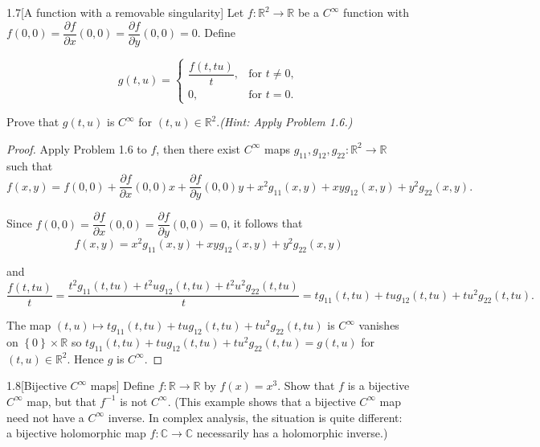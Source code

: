 \begin{problem}{1.7}[A function with a removable singularity]
Let \( f : \mathbb{R}^{2} \to \mathbb{R} \) be a \( C^{\infty} \) function with \( f(0,0) = \dfrac{\partial f}{\partial x} (0,0) = \dfrac{\partial f}{\partial y} (0,0) = 0 \). Define

\[
	g(t,u) =
	\begin{cases}
		\dfrac{f(t, tu)}{t}, & \text{for } t \neq 0, \\
		0,                   & \text{for } t = 0.
	\end{cases}
\]

Prove that \( g(t,u) \) is \( C^{\infty} \) for \( (t,u) \in \mathbb{R}^{2} \).\@\textit{(Hint: Apply Problem 1.6.)}
\end{problem}

\begin{proof}
	Apply Problem 1.6 to \( f \), then there exist \( C^{\infty} \) maps \( g_{11}, g_{12}, g_{22}: \mathbb{R}^{2} \to \mathbb{R} \) such that
	\[
		f(x, y) = f(0, 0) + \frac{\partial f}{\partial x}(0, 0)x + \frac{\partial f}{\partial y}(0, 0)y + x^{2}g_{11}(x, y) + xyg_{12}(x, y) + y^{2}g_{22}(x, y).
	\]

	Since \( f(0, 0) = \dfrac{\partial f}{\partial x} (0,0) = \dfrac{\partial f}{\partial y} (0,0) = 0 \), it follows that
	\[
		f(x, y) = x^{2}g_{11}(x, y) + xyg_{12}(x, y) + y^{2}g_{22}(x, y)
	\]

	and
	\[
		\frac{f(t, tu)}{t} = \frac{t^{2}g_{11}(t, tu) + t^{2}ug_{12}(t, tu) + t^{2}u^{2}g_{22}(t, tu)}{t} = tg_{11}(t, tu) + tug_{12}(t, tu) + tu^{2}g_{22}(t, tu).
	\]

	The map \( (t, u) \mapsto tg_{11}(t, tu) + tug_{12}(t, tu) + tu^{2}g_{22}(t, tu) \) is \( C^{\infty} \) vanishes on \( \left\{ 0 \right\} \times \mathbb{R} \) so \( tg_{11}(t, tu) + tug_{12}(t, tu) + tu^{2}g_{22}(t, tu) = g(t, u) \) for \( (t, u) \in \mathbb{R}^{2} \). Hence \( g \) is \( C^{\infty} \).
\end{proof}

\begin{problem}{1.8}[Bijective \( C^{\infty} \) maps]
Define \( f : \mathbb{R} \to \mathbb{R} \) by \( f(x) = x^{3} \). Show that \( f \) is a bijective \( C^{\infty} \) map, but that \( f^{-1} \) is not \( C^{\infty} \). (This example shows that a bijective \( C^{\infty} \) map need not have a \( C^{\infty} \) inverse. In complex analysis, the situation is quite different: a bijective holomorphic map \( f : \mathbb{C} \to \mathbb{C} \) necessarily has a holomorphic inverse.)
\end{problem}

